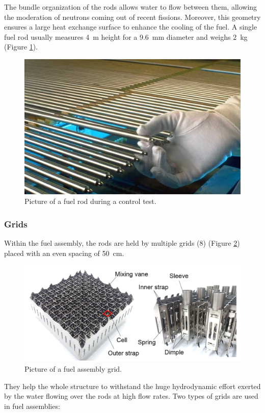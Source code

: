\npar

The bundle organization of the rods allows water to flow between them, allowing the moderation of neutrons coming out of recent fissions. Moreover, this geometry ensures a large heat exchange surface to enhance the cooling of the fuel. A single fuel rod usually measures 4\ m height for a 9.6\ mm diameter and weighs 2\ kg (Figure \ref{fig:fuel_rod}).


\begin{figure}[!h]
\centering
\includegraphics[width=0.6\linewidth]{img/intro/fuel_rod.jpg}
\caption{Picture of a fuel rod during a control test. \cite{doseequivalentbanana}}
\label{fig:fuel_rod}
\end{figure}

\npar
 
\subsubsection{Grids}

Within the fuel assembly, the rods are held by multiple grids (8) (Figure \ref{fig:fuel_grid}) placed with an even spacing of 50\ cm. 

\begin{figure}[!h]
\centering
\includegraphics[width=0.8\linewidth]{img/intro/pic_grid.png}
\caption{Picture of a fuel assembly grid. \cite{yoo_NED}}
\label{fig:fuel_grid}
\end{figure}

\npar


They help the whole structure to withstand the huge hydrodynamic effort exerted by the water flowing over the rods
at high flow rates. Two types of grids are used in fuel assemblies:

